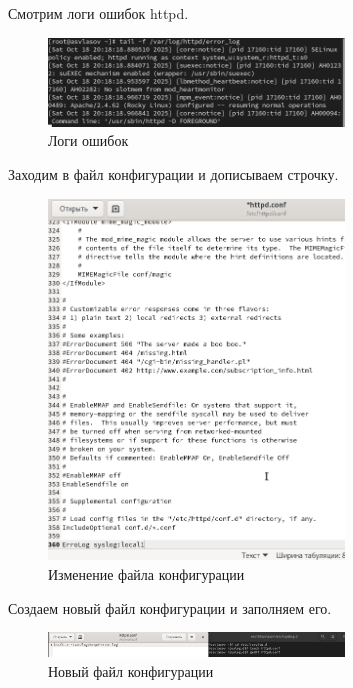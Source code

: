\documentclass[
  12pt,
  a4paper,
  DIV=11,
  numbers=noendperiod]{scrreprt}
\begin{document}
Смотрим логи ошибок httpd.

\begin{figure}

{\centering \includegraphics[width=0.7\textwidth,height=\textheight]{image/5.png}

}

\caption{Логи ошибок}

\end{figure}%

Заходим в файл конфигурации и дописываем строчку.

\begin{figure}

{\centering \includegraphics[width=0.7\textwidth,height=\textheight]{image/6.png}

}

\caption{Изменение файла конфигурации}

\end{figure}%

Создаем новый файл конфигурации и заполняем его.

\begin{figure}

{\centering \includegraphics[width=0.7\textwidth,height=\textheight]{image/7.png}

}

\caption{Новый файл конфигурации}

\end{figure}%
\end{document}
